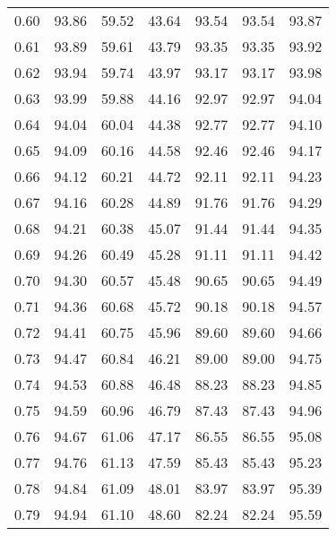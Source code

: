 \begin{tabular}{|c|c|c|c|c|c|c|}
      0.60 &     93.86 &     59.52 &      43.64 &   93.54 &      93.54 &         93.87 \\
      0.61 &     93.89 &     59.61 &      43.79 &   93.35 &      93.35 &         93.92 \\
      0.62 &     93.94 &     59.74 &      43.97 &   93.17 &      93.17 &         93.98 \\
      0.63 &     93.99 &     59.88 &      44.16 &   92.97 &      92.97 &         94.04 \\
      0.64 &     94.04 &     60.04 &      44.38 &   92.77 &      92.77 &         94.10 \\
      0.65 &     94.09 &     60.16 &      44.58 &   92.46 &      92.46 &         94.17 \\
      0.66 &     94.12 &     60.21 &      44.72 &   92.11 &      92.11 &         94.23 \\
      0.67 &     94.16 &     60.28 &      44.89 &   91.76 &      91.76 &         94.29 \\
      0.68 &     94.21 &     60.38 &      45.07 &   91.44 &      91.44 &         94.35 \\
      0.69 &     94.26 &     60.49 &      45.28 &   91.11 &      91.11 &         94.42 \\
      0.70 &     94.30 &     60.57 &      45.48 &   90.65 &      90.65 &         94.49 \\
      0.71 &     94.36 &     60.68 &      45.72 &   90.18 &      90.18 &         94.57 \\
      0.72 &     94.41 &     60.75 &      45.96 &   89.60 &      89.60 &         94.66 \\
      0.73 &     94.47 &     60.84 &      46.21 &   89.00 &      89.00 &         94.75 \\
      0.74 &     94.53 &     60.88 &      46.48 &   88.23 &      88.23 &         94.85 \\
      0.75 &     94.59 &     60.96 &      46.79 &   87.43 &      87.43 &         94.96 \\
      0.76 &     94.67 &     61.06 &      47.17 &   86.55 &      86.55 &         95.08 \\
      0.77 &     94.76 &     61.13 &      47.59 &   85.43 &      85.43 &         95.23 \\
      0.78 &     94.84 &     61.09 &      48.01 &   83.97 &      83.97 &         95.39 \\
      0.79 &     94.94 &     61.10 &      48.60 &   82.24 &      82.24 &         95.59 \\

\end{tabular}
